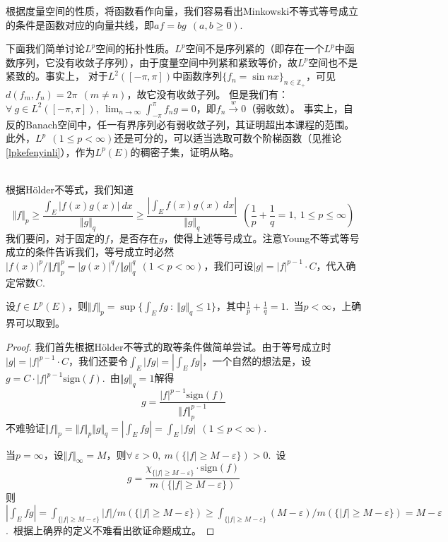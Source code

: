 \documentclass[color=green,thmcnt=section,lang=cn,12pt]{elegantbook}
\numberwithin{equation}{section}%
\numberwithin{figure}{section}%
\newcommand{\ZZ}{\mathbb{Z}}
\newcommand{\ee}{\varepsilon}
\newcommand{\any}{\forall \ }
\newcommand{\normp}[2]{\Vert #1 \Vert_{#2}}
\newcommand{\holder}{\textrm{Hölder}}
\begin{document}
根据度量空间的性质，将函数看作向量，我们容易看出Minkowski不等式等号成立的条件是函数对应的向量共线，即$af=bg\ \ (a,b\geq 0)$.


下面我们简单讨论$L^p$空间的拓扑性质。$L^p$空间不是序列紧的（即存在一个$L^p$中函数序列，它没有收敛子序列），由于度量空间中列紧和紧致等价，故$L^p$空间也不是紧致的。事实上，
对于$L^2([-\pi,\pi])$中函数序列$\{f_n=\sin nx\}_{n\in\ZZ_+}$，可见$d(f_m,f_n)=2\pi\ \ (m\ne n)$，故它没有收敛子列。
但是我们有：$\any g\in L^2([-\pi,\pi]),\ \lim_{n\to\infty}\int_{-\pi}^{\pi}f_ng=0$，即$f_n\xrightarrow{w}0$（弱收敛）。
事实上，自反的Banach空间中，任一有界序列必有弱收敛子列，其证明超出本课程的范围。
此外，$L^p\ \ (1\leq p<\infty)$还是可分的，可以适当选取可数个阶梯函数（见推论\ref{lpkefenyinli}），作为$L^p(E)$的稠密子集，证明从略。\\
\ 


根据$\holder$不等式，我们知道
\begin{equation*}
    \normp{f}{p}\geq \frac{\int_E\left\lvert f(x)g(x)\right\rvert\ dx  }{\normp{g}{q}}\geq \frac{\left\lvert \int_Ef(x)g(x)\ dx \right\rvert }{\normp{g}{q}}\ \ (\frac{1}{p}+\frac{1}{q}=1,\ 1\leq p\leq \infty)
\end{equation*}
我们要问，对于固定的$f$，是否存在$g$，使得上述等号成立。注意Young不等式等号成立的条件告诉我们，等号成立时必然$|f(x)|^p/\normp{f}{p}^p=|g(x)|^q/\normp{g}{q}^q\ \ (1<p<\infty)$，我们可设$|g|=|f|^{p-1}\cdot C$，代入确定常数C.\ 
\begin{proposition}\label{lpfanshudekehua}
    设$f\in L^p(E)$，则$\normp{f}{p}=\sup\{\int_Efg\ :\ \normp{g}{q}\leq 1\}$，其中$\frac{1}{p}+\frac{1}{q}=1$.\ 当$p<\infty$，上确界可以取到。
\end{proposition}
\begin{proof}
    我们首先根据$\holder$不等式的取等条件做简单尝试。由于等号成立时$|g|=|f|^{p-1}\cdot C$，我们还要令$\int_E|fg|=|\int_Efg|$，一个自然的想法是，设
    $g=C\cdot |f|^{p-1}\textrm{sign}(f)$.\ 由$\normp{g}{q}=1$解得
   \begin{equation*}
     g=\frac{|f|^{p-1}\textrm{sign}(f)}{\normp{f}{p}^{p-1}}
   \end{equation*}
    不难验证$\normp{f}{p}=\normp{f}{p}\normp{g}{q}=|\int_Efg|=\int_E|fg|\ \ (1\leq p<\infty)$.


    当$p=\infty$，设$\normp{f}{\infty}=M$，则$\any \ee>0,\ m(\{|f|\geq M-\ee\})>0$.\ 设\begin{equation*}
        g=\frac{\chi_{\{|f|\geq M-\ee\}}\cdot \textrm{sign}(f)}{m(\{|f|\geq M-\ee\})}
    \end{equation*}
    则    $|\int_Efg|=\int_{\{|f|\geq M-\ee\}}|f|/m(\{|f|\geq M-\ee\})\geq \int_{\{|f|\geq M-\ee\}}(M-\ee)/m(\{|f|\geq M-\ee\})=M-\ee$.\ 根据上确界的定义不难看出欲证命题成立。
\end{proof}
\ 
\end{document}
